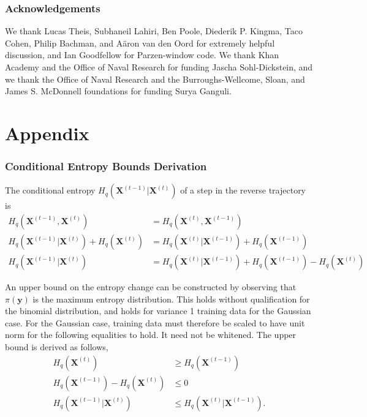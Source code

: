 \documentclass{article}
\newcommand{\mb}{\mathbf}
\begin{document}
\section*{Acknowledgements}
We thank Lucas Theis, Subhaneil Lahiri, Ben Poole, Diederik P. Kingma, Taco Cohen, Philip Bachman, and A\"{a}ron van den Oord for extremely helpful discussion, and Ian Goodfellow for Parzen-window code. We thank Khan Academy and the Office of Naval Research for funding Jascha Sohl-Dickstein, and we thank the Office of Naval Research and the Burroughs-Wellcome, Sloan, and James S. McDonnell foundations for funding Surya Ganguli.



\onecolumn

\clearpage
\appendix

\normalsize

\part*{Appendix}

\setcounter{figure}{0} \renewcommand{\thefigure}{A.\arabic{figure}}
\setcounter{table}{0} \renewcommand{\thetable}{A.\arabic{table}}

\section{Conditional Entropy Bounds Derivation}\label{app entropy}

The conditional entropy $H_q\left( \mb X^{(t-1)} | \mb X^{(t)} \right)$ of a step in the reverse trajectory is
\begin{align}
H_q\left( \mb X^{(t-1)}, \mb X^{(t)} \right) &= H_q\left( \mb X^{(t)}, \mb X^{(t-1)} \right) \\
H_q\left( \mb X^{(t-1)} | \mb X^{(t)} \right) + H_q\left( \mb X^{(t)} \right) &= H_q\left( \mb X^{(t)} | \mb X^{(t-1)} \right) + H_q\left( \mb X^{(t-1)} \right) \\
H_q\left( \mb X^{(t-1)} | \mb X^{(t)} \right) &= H_q\left( \mb X^{(t)} | \mb X^{(t-1)} \right) + H_q\left( \mb X^{(t-1)} \right) - H_q\left( \mb X^{(t)} \right) \label{eq cond equal}
\end{align}

An upper bound on the entropy change can be constructed by observing that $\pi\left( \mb y \right)$ is the maximum entropy distribution.  This holds 
without qualification for the binomial distribution, and holds for variance 1 training data for the Gaussian case.  For the Gaussian case, training data 
must therefore be scaled to have unit norm for the following equalities to hold.  It need not be whitened.
The upper bound is derived as follows,
\begin{align}
H_q\left( \mb X^{(t)} \right) &\ge H_q\left( \mb X^{(t-1)} \right) \\
H_q\left( \mb X^{(t-1)} \right) - H_q\left( \mb X^{(t)} \right) &\le 0 \label{eq diff lb} \\
H_q\left( \mb X^{(t-1)} | \mb X^{(t)} \right) &\leq H_q\left( \mb X^{(t)} | \mb X^{(t-1)} \right)
.
\end{align}
\end{document}
